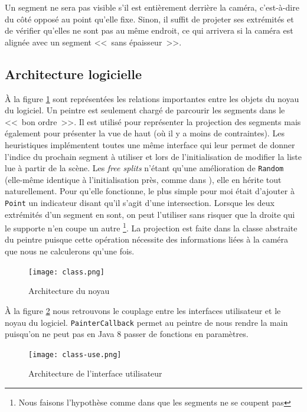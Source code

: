 \documentclass[12pt,twocolumn]{article}
\begin{document}
Un segment ne sera pas visible s'il est entièrement derrière la caméra,
c'est-à-dire du côté opposé au point qu'elle fixe. Sinon, il suffit de projeter
ses extrémités et de vérifier qu'elles ne sont pas au même endroit, ce qui
arrivera si la caméra est alignée avec un segment <<~sans épaisseur~>>.


\subsection{Architecture logicielle}
À la figure \ref{fig:core} sont représentées les relations importantes
entre les objets du noyau du logiciel. Un peintre est seulement chargé
de parcourir les segments dans le <<~bon ordre~>>. Il est utilisé pour
représenter la projection des segments mais également pour présenter la vue de
haut (où il y a moins de contraintes). Les heuristiques implémentent toutes une
même interface qui leur permet de donner l'indice du prochain segment à utiliser
et lors de l'initialisation de modifier la liste lue à partir de la scène.
Les \textit{free splits} n'étant qu'une amélioration de \texttt{Random}
(elle-même identique à l'initialisation près, comme dans \cite[p.~256]{cg}),
elle en hérite tout naturellement. Pour qu'elle fonctionne, le plus simple
pour moi était
d'ajouter à \texttt{Point} un indicateur disant qu'il s'agit d'une intersection.
Lorsque les deux extrémités d'un segment en sont, on peut l'utiliser sans
risquer que la droite qui le supporte n'en coupe un autre
\footnote{Nous faisons l'hypothèse comme dans \cite[p.~256]{cg}
que les segments ne se coupent pas}.
La projection est faite dans la classe abstraite du peintre puisque
cette opération nécessite des informations liées à la caméra
que nous ne calculerons qu'une fois.

\begin{figure}[h]
\center
\texttt{[image: class.png]}
\caption{Architecture du noyau}\label{fig:core}
\end{figure}

À la figure \ref{fig:ui} nous retrouvons le couplage entre les interfaces
utilisateur et le noyau du logiciel. \texttt{PainterCallback} permet au peintre
de nous rendre la main puisqu'on ne peut pas en Java 8 passer de fonctions en
paramètres.

\begin{figure}[h]
\center
\texttt{[image: class-use.png]}
\caption{Architecture de l'interface utilisateur}\label{fig:ui}
\end{figure}
\end{document}
